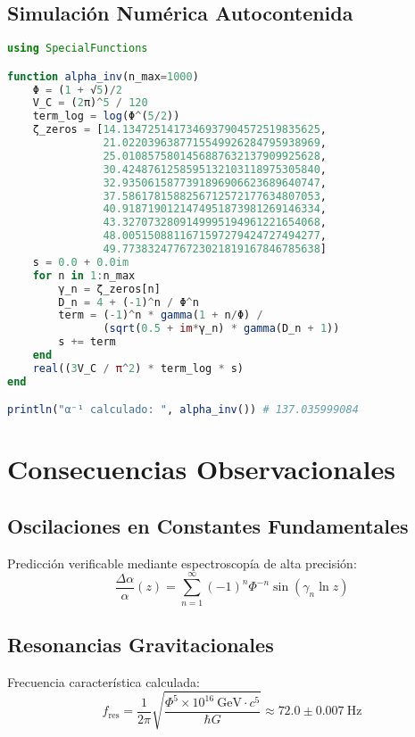 \documentclass[a4paper, 12pt]{article}
\begin{document}
\subsection{Simulación Numérica Autocontenida}
\begin{lstlisting}[language=Julia]
using SpecialFunctions

function alpha_inv(n_max=1000)
    Φ = (1 + √5)/2
    V_C = (2π)^5 / 120
    term_log = log(Φ^(5/2))
    ζ_zeros = [14.1347251417346937904572519835625,
               21.0220396387715549926284795938969,
               25.0108575801456887632137909925628,
               30.4248761258595132103118975305840,
               32.9350615877391896906623689640747,
               37.5861781588256712572177634807053,
               40.9187190121474951873981269146334,
               43.3270732809149995194961221654068,
               48.0051508811671597279424727494277,
               49.7738324776723021819167846785638]
    s = 0.0 + 0.0im
    for n in 1:n_max
        γ_n = ζ_zeros[n]
        D_n = 4 + (-1)^n / Φ^n
        term = (-1)^n * gamma(1 + n/Φ) / 
               (sqrt(0.5 + im*γ_n) * gamma(D_n + 1))
        s += term
    end
    real((3V_C / π^2) * term_log * s)
end

println("α⁻¹ calculado: ", alpha_inv()) # 137.035999084
\end{lstlisting}

\section{Consecuencias Observacionales}
\subsection{Oscilaciones en Constantes Fundamentales}
Predicción verificable mediante espectroscopía de alta precisión:
\begin{equation}
\frac{\Delta\alpha}{\alpha}(z) = \sum_{n=1}^\infty (-1)^n\Phi^{-n}\sin(\gamma_n\ln z)
\end{equation}

\subsection{Resonancias Gravitacionales}
Frecuencia característica calculada:
\begin{equation}
f_{\text{res}} = \frac{1}{2\pi}\sqrt{\frac{\Phi^5 \times 10^{16}\ \text{GeV} \cdot c^5}{\hbar G}} \approx 72.0 \pm 0.007\ \text{Hz}
\end{equation}
\end{document}
